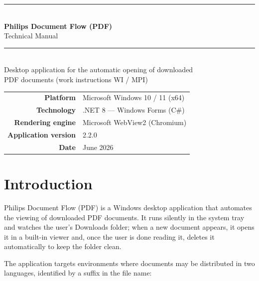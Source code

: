 \documentclass[11pt,a4paper]{article}
\begin{document}
\begin{titlepage}
\centering
\vspace*{3cm}
{\color{black}\rule{\textwidth}{1.2pt}}\\[0.8cm]
{\Huge\bfseries Philips Document Flow (PDF)}\\[0.5cm]
{\LARGE Technical Manual}\\[0.4cm]
{\color{black}\rule{\textwidth}{1.2pt}}\\[2cm]

{\large Desktop application for the automatic opening of downloaded\\
PDF documents (work instructions WI / MPI)}\\[3cm]

\begin{tabular}{@{}r l@{}}
\textbf{Platform} & Microsoft Windows 10 / 11 (x64) \\[5pt]
\textbf{Technology} & .NET 8 --- Windows Forms (C\#) \\[5pt]
\textbf{Rendering engine} & Microsoft WebView2 (Chromium) \\[5pt]
\textbf{Application version} & 2.2.0 \\[5pt]
\textbf{Date} & June 2026 \\
\end{tabular}

\vfill
\end{titlepage}

\tableofcontents
\newpage

\section{Introduction}
Philips Document Flow (PDF) is a Windows desktop application that automates the
viewing of downloaded PDF documents. It runs silently in the system tray and
watches the user's Downloads folder; when a new document appears, it opens it in a
built-in viewer and, once the user is done reading it, deletes it automatically to
keep the folder clean.

The application targets environments where documents may be distributed in two
languages, identified by a suffix in the file name:
\end{document}
